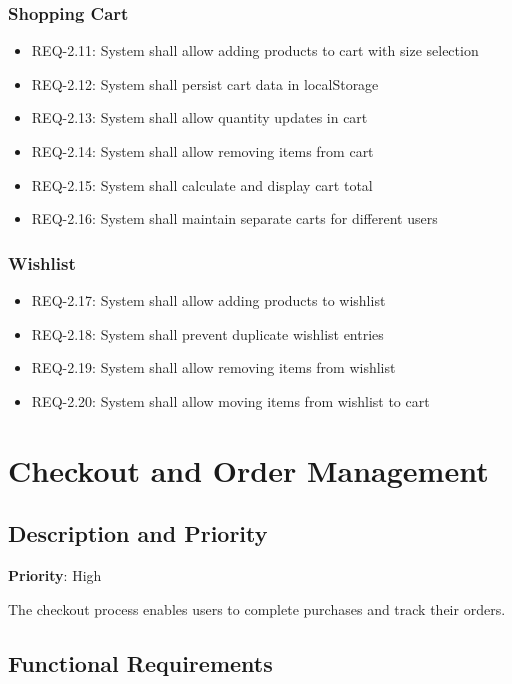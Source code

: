 \documentclass{scrreprt}
\begin{document}
\subsubsection{Shopping Cart}
\begin{itemize}
\item REQ-2.11: System shall allow adding products to cart with size selection
\item REQ-2.12: System shall persist cart data in localStorage
\item REQ-2.13: System shall allow quantity updates in cart
\item REQ-2.14: System shall allow removing items from cart
\item REQ-2.15: System shall calculate and display cart total
\item REQ-2.16: System shall maintain separate carts for different users
\end{itemize}

\subsubsection{Wishlist}
\begin{itemize}
\item REQ-2.17: System shall allow adding products to wishlist
\item REQ-2.18: System shall prevent duplicate wishlist entries
\item REQ-2.19: System shall allow removing items from wishlist
\item REQ-2.20: System shall allow moving items from wishlist to cart
\end{itemize}

\section{Checkout and Order Management}

\subsection{Description and Priority}
\textbf{Priority}: High

The checkout process enables users to complete purchases and track their orders.

\subsection{Functional Requirements}
\end{document}
